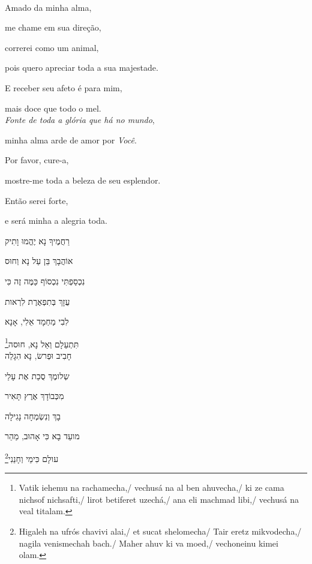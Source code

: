 \movetooddpage
\raggedright

\vspace*{1cm}

\textbf{}\\[15pt]

Amado da minha alma,

me chame em sua direção,

correrei como um animal,

pois quero apreciar toda a sua majestade.

E receber seu afeto é para mim,

mais doce que todo o mel.\\[10pt]

\emph{Fonte de toda a glória que há no mundo},

minha alma arde de amor por \emph{Você}.

Por favor, cure-a,

mostre-me toda a beleza de seu esplendor.

Então serei forte,

e será minha a alegria toda.\\[10pt]

\movetoevenpage
\raggedleft

\vspace*{1cm}

רַחֲמֶיךָ נָא יֶהֱמוּ וָתִיק 

אוֹהֲבָךְ בֵּן עַל נָא וְחוּס 

נִכְסַפְתִּי נִכְסוֹף כַּמֶּה זֶה כִּי 

עֻזָךְ בְּתִפְאֶרֶת לִרְאות 

לִבִי מַחְמָד אֵלִי, אָנָא 

תִּתְעַלָם וְאַל נָא, חוּסה\footnote{Vatik iehemu na rachamecha,/
vechusá na al ben ahuvecha,/ ki ze cama nichsof nichsafti,/ lirot betiferet uzechá,/
ana eli machmad libi,/ vechusá na veal titalam.}\\[10pt]

חָבִיב וּפְרשׂ, נָא הִגָלֵה

שְלומֶךְ סֻכַת אֶת עָלַי 

מִכְּבוֹדָךְ אֶרֶץ תָּאִיר 

בָךְ וְנִשְׂמְחָה נָגִילָה 

מועֵד בָא כִּי אָהוּב, מַהֵר

עולָם כִּימֵי וְחָנֵנִי\footnote{
Higaleh na ufrós chavivi alai,/
et sucat shelomecha/ Tair eretz mikvodecha,/ nagila venismechah bach./ Maher ahuv ki va moed,/
vechoneinu kimei olam.}

